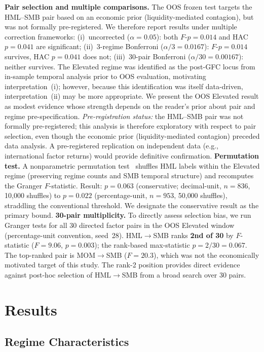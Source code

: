 \documentclass[sigconf,anonymous]{acmart}
\begin{document}
\textbf{Pair selection and multiple comparisons.} The OOS frozen test targets
the HML--SMB pair based on an economic prior (liquidity-mediated contagion),
but was not formally pre-registered. We therefore report results under
multiple correction frameworks:
(i)~uncorrected ($\alpha = 0.05$): both $F$-$p = 0.014$ and HAC $p = 0.041$ are significant;
(ii)~3-regime Bonferroni ($\alpha/3 = 0.0167$): $F$-$p = 0.014$ survives, HAC $p = 0.041$ does not;
(iii)~30-pair Bonferroni ($\alpha/30 = 0.00167$): neither survives.
The Elevated regime was identified as the post-GFC locus from in-sample temporal
analysis prior to OOS evaluation, motivating interpretation~(i); however, because
this identification was itself data-driven, interpretation~(ii) may be more
appropriate. We present the OOS Elevated result as modest evidence whose
strength depends on the reader's prior about pair and regime pre-specification.
\emph{Pre-registration status:} the HML--SMB pair was not formally pre-registered;
this analysis is therefore exploratory with respect to pair selection, even
though the economic prior (liquidity-mediated contagion) preceded data analysis.
A pre-registered replication on independent data (e.g., international factor
returns) would provide definitive confirmation.
\textbf{Permutation test.} A nonparametric permutation
test~\cite{good2005permutation} shuffles HML labels within the Elevated regime
(preserving regime counts and SMB temporal structure) and recomputes the Granger
$F$-statistic. Result: $p = 0.063$ (conservative; decimal-unit, $n = 836$,
10{,}000 shuffles) to $p = 0.022$ (percentage-unit, $n = 953$, 50{,}000 shuffles),
straddling the conventional threshold. We designate the conservative result as the
primary bound.
\textbf{30-pair multiplicity.} To directly assess selection bias, we run Granger
tests for all 30 directed factor pairs in the OOS Elevated window (percentage-unit
convention, seed~28). HML$\to$SMB ranks \textbf{2nd of 30} by $F$-statistic
($F = 9.06$, $p = 0.003$); the rank-based max-statistic $p = 2/30 = 0.067$.
The top-ranked pair is MOM$\to$SMB ($F = 20.3$), which was not the
economically motivated target of this study.
The rank-2 position provides direct evidence against post-hoc selection of HML$\to$SMB
from a broad search over 30 pairs.

\section{Results}

\subsection{Regime Characteristics}
\end{document}
